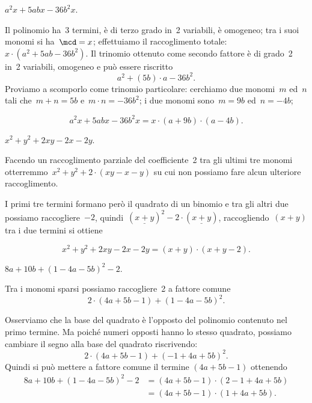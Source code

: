 \begin{exrig}
 \begin{esempio}
 $a^{2}x+5abx-36b^{2}x$.

Il polinomio ha~3 termini, è di terzo grado in~2 variabili, è
omogeneo;
tra i suoi monomi si ha~$\mcd= x$; effettuiamo il raccoglimento
totale:~$x\cdot\left(a^{2}+5ab-36b^{2}\right)$.
Il trinomio ottenuto come secondo fattore è di grado~2 in~2 variabili,
omogeneo e può essere riscritto
\[a^{2}+\left(5b\right)\cdot a-36b^{2}.\]
Proviamo a scomporlo come trinomio particolare:
cerchiamo due monomi~$m$ ed~$n$ tali che~$m+n=5b$
e~$m\cdot n=-36b^{2}$; i due monomi sono~$m=9b$
ed~$n=-4b$;

\[a^{2}x+5abx-36b^{2}x=x\cdot\left(a+9b\right)\cdot \left(a-4b\right).\]
 \end{esempio}

 \begin{esempio}
 $x^{2}+y^{2}+2xy-2x-2y$.

Facendo un raccoglimento parziale del coefficiente~2 tra gli ultimi tre
monomi otterremmo~$x^{2}+y^{2}+2\cdot(xy-x-y)$ su cui non possiamo
fare alcun ulteriore raccoglimento.

I primi tre termini formano però il quadrato di un binomio e tra gli
altri due possiamo raccogliere~$-2$, quindi~$(\underline{x+y})^{2}-2\cdot(\underline{x+y})$,
raccogliendo~$(x + y)$ tra i due termini si ottiene

\begin{equation*}
x^{2}+y^{2}+2xy-2x-2y=\left(x+y\right)\cdot \left(x+y-2\right).
\end{equation*}
 \end{esempio}

 \begin{esempio}
 $8a+10b+\left(1-4a-5b\right)^{2}-2$.

Tra i monomi sparsi possiamo raccogliere~2 a fattore comune
\[2\cdot \left(4a+5b-1\right)+\left(1-4a-5b\right)^{2}.\]

Osserviamo che la base del quadrato è l'opposto del polinomio contenuto
nel primo termine. Ma poiché numeri opposti hanno
lo stesso quadrato, possiamo cambiare il segno alla base del quadrato riscrivendo:
\[2\cdot\left(4a+5b-1\right)+\left(-1+4a+5b\right)^{2}.\]
Quindi si può mettere a fattore comune il termine $(4a+5b-1)$ ottenendo
\begin{align*}
8a+10b+(1-4a-5b)^{2}-2&=\left(4a+5b-1\right)\cdot\left(2-1+4a+5b\right)\\
&=\left(4a+5b-1\right)\cdot\left(1+4a+5b\right).
\end{align*}
 \end{esempio}


\end{exrig}
